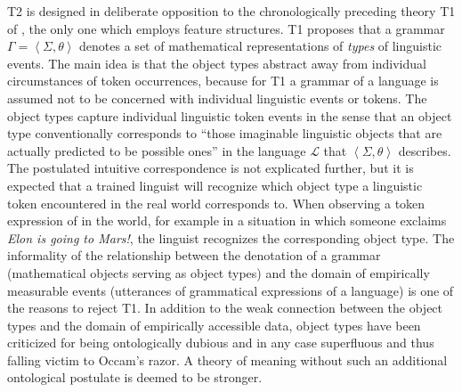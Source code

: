 \documentclass[output=paper,biblatex,babelshorthands,newtxmath,draftmode,colorlinks,citecolor=brown]{langscibook}
\begin{document}
{T2 is designed in deliberate opposition to the chronologically
preceding theory T1 of \citet{PollardSag1994}, the only one which
employs feature structures. T1 proposes that a grammar $\Gamma=\left<
\Sigma, \theta\right>$ denotes a set of mathematical representations
of \emph{types} of linguistic events. The main idea is that the object
types abstract away from individual circumstances of token
occurrences, because for T1 a grammar of a language is assumed not to
be concerned with individual linguistic events or tokens.  The object
types capture individual linguistic token events in the sense that an
object type conventionally corresponds to ``those imaginable linguistic
objects that are actually predicted to be possible ones''
\citep[7]{PollardSag1994} in
the language $\mathcal{L}$ that $\left< \Sigma, \theta\right>$
describes.  The postulated intuitive correspondence is not explicated
further, but it is expected that a trained linguist will recognize
which object type a linguistic token encountered in the real world
corresponds to. When observing a token expression of  in the
world, for example in a situation in which someone exclaims \emph{Elon
  is going to Mars!}, the linguist recognizes the corresponding object
type. The informality of the relationship between the denotation of a
grammar (mathematical objects serving as object types) and the domain
of empirically measurable events (utterances of grammatical expressions
of a language) is one of the reasons to reject T1.  In addition to the
weak connection between the object types and the domain of empirically
accessible data, object types have been criticized for being
ontologically dubious and in any case superfluous and thus falling victim
to Occam's razor. A theory of meaning without such an additional
ontological postulate is deemed to be stronger.



}
\end{document}
